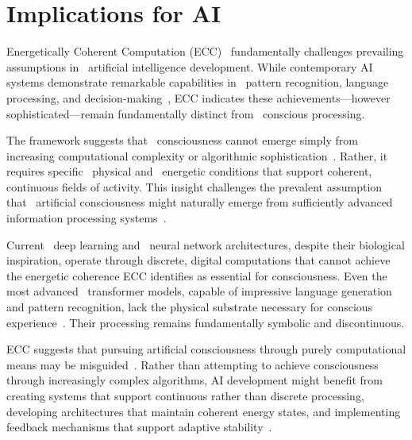 \section{Implications for AI}

Energetically Coherent Computation (ECC)~ fundamentally challenges prevailing assumptions in~ artificial intelligence development. While contemporary AI systems demonstrate remarkable capabilities in~ pattern recognition, language processing, and decision-making~\cite{Marcus2019, Markovic2020}, ECC indicates these achievements—however sophisticated—remain fundamentally distinct from~ conscious processing.

The framework suggests that~ consciousness cannot emerge simply from increasing computational complexity or algorithmic sophistication~\cite{Dreyfus1992, Wegner2003}. Rather, it requires specific~ physical and~ energetic conditions that support coherent, continuous fields of activity. This insight challenges the prevalent assumption that~ artificial consciousness might naturally emerge from sufficiently advanced information processing systems~\cite{Bostrom2014, butlin2023consciousnessartificialintelligenceinsights}.

Current~ deep learning and~ neural network architectures, despite their biological inspiration, operate through discrete, digital computations that cannot achieve the energetic coherence ECC identifies as essential for consciousness. Even the most advanced~ transformer models, capable of impressive language generation and pattern recognition, lack the physical substrate necessary for conscious experience~\cite{Lake2017, Raychowdhury2020}. Their processing remains fundamentally symbolic and discontinuous.

ECC suggests that pursuing artificial consciousness through purely computational means may be misguided~\cite{Churchland2013}. Rather than attempting to achieve consciousness through increasingly complex algorithms, AI development might benefit from creating systems that support continuous rather than discrete processing, developing architectures that maintain coherent energy states, and implementing feedback mechanisms that support adaptive stability~\cite{Brooks1999, MacLennan2009}.

